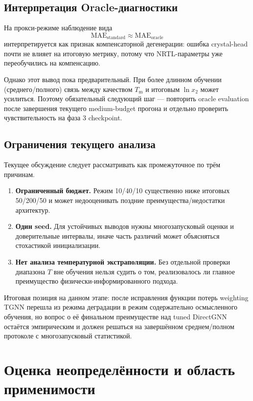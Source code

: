 \documentclass[11pt]{article}
\begin{document}
\subsection{Интерпретация Oracle-диагностики}

На прокси-режиме наблюдение вида
\begin{equation*}
\mathrm{MAE}_{\mathrm{standard}} \approx \mathrm{MAE}_{\mathrm{oracle}}
\end{equation*}
интерпретируется как признак компенсаторной дегенерации: ошибка crystal-head почти не влияет на итоговую метрику, потому что NRTL-параметры уже переобучились на компенсацию.

Однако этот вывод пока предварительный. При более длинном обучении (среднего/полного) связь между качеством $T_{\mathrm{m}}$ и итоговым $\ln x_2$ может усилиться. Поэтому обязательный следующий шаг --- повторить oracle evaluation после завершения текущего medium-budget прогона и отдельно проверить чувствительность на фаза 3 checkpoint.

\subsection{Ограничения текущего анализа}

Текущее обсуждение следует рассматривать как промежуточное по трём причинам.

\begin{enumerate}
  \item \textbf{Ограниченный бюджет.} Режим 10/40/10 существенно ниже итоговых 50/200/50 и может недооценивать поздние преимущества/недостатки архитектур.
  \item \textbf{Один seed.} Для устойчивых выводов нужны многозапусковый оценки и доверительные интервалы, иначе часть различий может объясняться стохастикой инициализации.
  \item \textbf{Нет анализа температурной экстраполяции.} Без отдельной проверки диапазона $T$ вне обучения нельзя судить о том, реализовалось ли главное преимущество физически-информированного подхода.
\end{enumerate}

Итоговая позиция на данном этапе: после исправления функции потерь weighting TGNN перешла из режима деградации в режим содержательно осмысленного обучения, но вопрос о её финальном преимуществе над tuned DirectGNN остаётся эмпирическим и должен решаться на завершённом среднем/полном протоколе с многозапусковый статистикой.


\section{Оценка неопределённости и область применимости}
\end{document}
